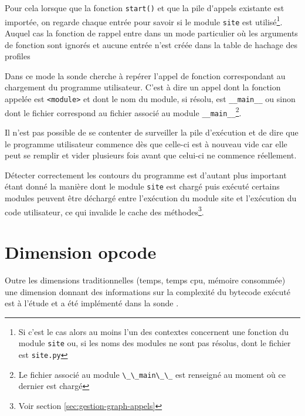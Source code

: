 Pour cela lorsque que la fonction \verb|start()| et que la \gls{pile d'appels} existante est importée, on regarde chaque entrée pour savoir si le module \verb|site| est utilisé\footnote{Si c'est le cas alors au moins l'un des contextes concernent une fonction du module \verb|site| ou, si les noms des modules ne sont pas résolus, dont le fichier est \verb|site.py|}. Auquel cas la fonction de rappel entre dans un mode particulier où les arguments de fonction sont ignorés et aucune entrée n'est créée dans la table de hachage des profiles

Dans ce mode la sonde cherche à repérer l'appel de fonction correspondant au chargement du programme utilisateur. C'est à dire un appel dont la fonction appelée est \verb|<module>| et dont le nom du module, si résolu, est \verb|__main__| ou sinon dont le fichier correspond au fichier associé au module \verb|__main__|\footnote{Le fichier associé au module \verb?\_\_main\_\_? est renseigné au moment où ce dernier est chargé}.

\begin{note}
Il n'est pas possible de se contenter de surveiller la pile d'exécution et de dire que le programme utilisateur commence dès que celle-ci est à nouveau vide car elle peut se remplir et vider plusieurs fois avant que celui-ci ne commence réellement.
\end{note}

\begin{note}
Détecter correctement les contours du programme est d'autant plus important étant donné la manière dont le module \verb|site| est chargé puis exécuté certains modules peuvent être déchargé entre l'exécution du module site et l'exécution du code utilisateur, ce qui invalide le cache des méthodes\footnote{Voir section \vref{sec:gestion-graph-appels}}.
\end{note}

  \section{Dimension opcode}
    
Outre les dimensions traditionnelles (temps, temps cpu, mémoire consommée) une dimension donnant des informations sur la complexité du \gls{bytecode} exécuté est à l'étude et a été implémenté dans la sonde \Python.

